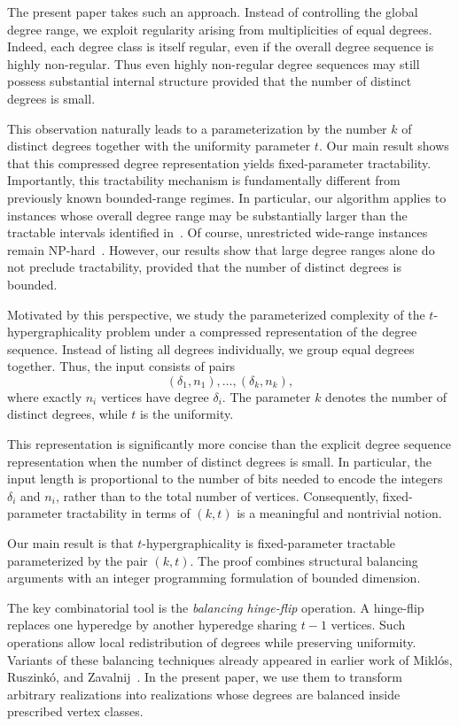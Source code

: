 \documentclass[pdflatex,sn-mathphys-num]{sn-jnl}%
\theoremstyle{thmstyleone}%
\theoremstyle{thmstyletwo}%
\theoremstyle{thmstylethree}%
\begin{document}
The present paper takes such an approach. Instead of controlling the global degree range, we exploit regularity arising from multiplicities of equal degrees. Indeed, each degree class is itself regular, even if the overall degree sequence is highly non-regular. Thus even highly non-regular degree sequences may still possess substantial internal structure provided that the number of distinct degrees is small.

This observation naturally leads to a parameterization by the number $k$ of distinct degrees together with the uniformity parameter $t$. Our main result shows that this compressed degree representation yields fixed-parameter tractability. Importantly, this tractability mechanism is fundamentally different from previously known bounded-range regimes. In particular, our algorithm applies to instances whose overall degree range may be substantially larger than the tractable intervals identified in~\cite{LMMZ}. Of course, unrestricted wide-range instances remain NP-hard~\cite{LMMZ,MRZ}. However, our results show that large degree ranges alone do not preclude tractability, provided that the number of distinct degrees is bounded.


Motivated by this perspective, we study the parameterized complexity of the $t$-hypergraphicality problem under a compressed representation of the degree sequence. Instead of listing all degrees individually, we group equal degrees together. Thus, the input consists of pairs
\[
(\delta_1,n_1),\dots,(\delta_k,n_k),
\]
where exactly $n_i$ vertices have degree $\delta_i$. The parameter $k$ denotes the number of distinct degrees, while $t$ is the uniformity.

This representation is significantly more concise than the explicit degree sequence representation when the number of distinct degrees is small. In particular, the input length is proportional to the number of bits needed to encode the integers $\delta_i$ and $n_i$, rather than to the total number of vertices. Consequently, fixed-parameter tractability in terms of $(k,t)$ is a meaningful and nontrivial notion.

Our main result is that $t$-hypergraphicality is fixed-parameter tractable parameterized by the pair $(k,t)$. The proof combines structural balancing arguments with an integer programming formulation of bounded dimension.

The key combinatorial tool is the \emph{balancing hinge-flip} operation. A hinge-flip replaces one hyperedge by another hyperedge sharing $t-1$ vertices. Such operations allow local redistribution of degrees while preserving uniformity. Variants of these balancing techniques already appeared in earlier work of Mikl\'os, Ruszink\'o, and Zavalnij~\cite{MRZ}. In the present paper, we use them to transform arbitrary realizations into realizations whose degrees are balanced inside prescribed vertex classes.
\end{document}
